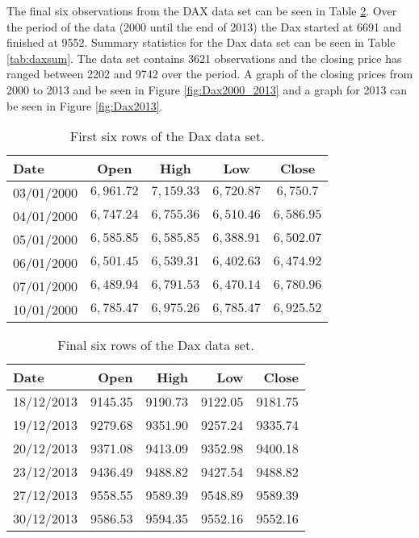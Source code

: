 The final six observations from the DAX data set can be seen in Table \ref{tab:daxtail}. Over the period of the data (2000 until the end of 2013) the Dax started at 6691 and finished at 9552. Summary statistics for the Dax data set can be seen in Table \ref{tab:daxsum}. The data set contains 3621 observations and the closing price has ranged between 2202 and 9742 over the period. A graph of the closing prices from 2000 to 2013 and be seen in Figure \ref{fig:Dax2000_2013} and a graph for 2013 can be seen in Figure \ref{fig:Dax2013}.

\begin{table}[!htbp] \centering	
\caption[Dax table set - head.]{First six rows of the Dax data set.}
\label{tab:daxhead}
\begin{tabular}{lcccc}
\toprule
Date & Open & High & Low & Close \\
\midrule
03/01/2000 & $6,961.72$ & $7,159.33$ & $6,720.87$ & $6,750.7$ \\
04/01/2000 & $6,747.24$ & $6,755.36$ & $6,510.46$ & $6,586.95$ \\
05/01/2000 & $6,585.85$ & $6,585.85$ & $6,388.91$ & $6,502.07$ \\
06/01/2000 & $6,501.45$ & $6,539.31$ & $6,402.63$ & $6,474.92$ \\
07/01/2000 & $6,489.94$ & $6,791.53$ & $6,470.14$ & $6,780.96$ \\
10/01/2000 & $6,785.47$ & $6,975.26$ & $6,785.47$ & $6,925.52$ \\
\bottomrule
\end{tabular}
\end{table}

\begin{table}[ht]
\centering
\caption[Dax table set - tail.]{Final six rows of the Dax data set.}
\label{tab:daxtail}
\begin{tabular}{lrrrr}
  \toprule
 Date & Open & High & Low & Close \\ 
  \midrule
  18/12/2013 & 9145.35 & 9190.73 & 9122.05 & 9181.75 \\ 
  19/12/2013 & 9279.68 & 9351.90 & 9257.24 & 9335.74 \\ 
  20/12/2013 & 9371.08 & 9413.09 & 9352.98 & 9400.18 \\ 
  23/12/2013 & 9436.49 & 9488.82 & 9427.54 & 9488.82 \\ 
  27/12/2013 & 9558.55 & 9589.39 & 9548.89 & 9589.39 \\ 
  30/12/2013 & 9586.53 & 9594.35 & 9552.16 & 9552.16 \\ 
  \bottomrule
\end{tabular} 
\end{table}

